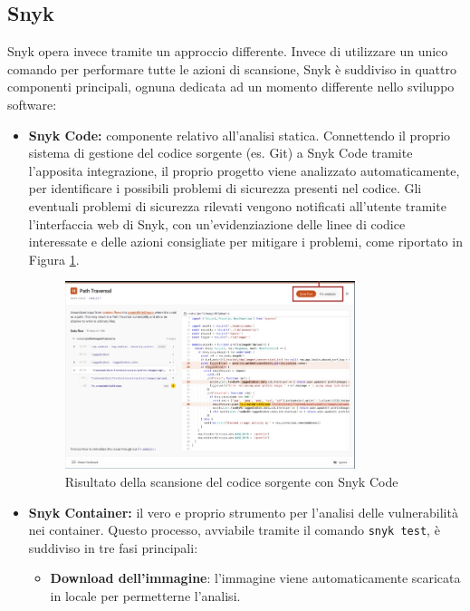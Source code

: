 \subsection{Snyk}
Snyk opera invece tramite un approccio differente\cite{snyk_docs}. Invece di utilizzare un unico comando per performare tutte le azioni di scansione, Snyk è suddiviso in quattro componenti principali, ognuna dedicata ad un momento differente nello sviluppo software:
\begin{itemize}
   \item \textbf{Snyk Code:} componente relativo all'analisi statica. Connettendo il proprio sistema di gestione del codice sorgente (es. Git) a Snyk Code tramite l'apposita integrazione, il proprio progetto viene analizzato automaticamente, per identificare i possibili problemi di sicurezza presenti nel codice. Gli eventuali problemi di sicurezza rilevati vengono notificati all'utente tramite l'interfaccia web di Snyk, con un'evidenziazione delle linee di codice interessate e delle azioni consigliate per mitigare i problemi, come riportato in Figura \ref{fig:snyk_code}.
         \begin{figure}[H]
            \centering
            \includegraphics[width=0.8\textwidth]{immagini/capitolo1/snyk_code.jpg}
            \caption{Risultato della scansione del codice sorgente con Snyk Code}
            \label{fig:snyk_code}
         \end{figure}
   \item \textbf{Snyk Container:} il vero e proprio strumento per l'analisi delle vulnerabilità nei container. Questo processo, avviabile tramite il comando \texttt{snyk test}, è suddiviso in tre fasi principali:
         \begin{itemize}
            \item \textbf{Download dell'immagine}: l'immagine viene automaticamente scaricata in locale per permetterne l'analisi.

\end{itemize}
\end{itemize}

